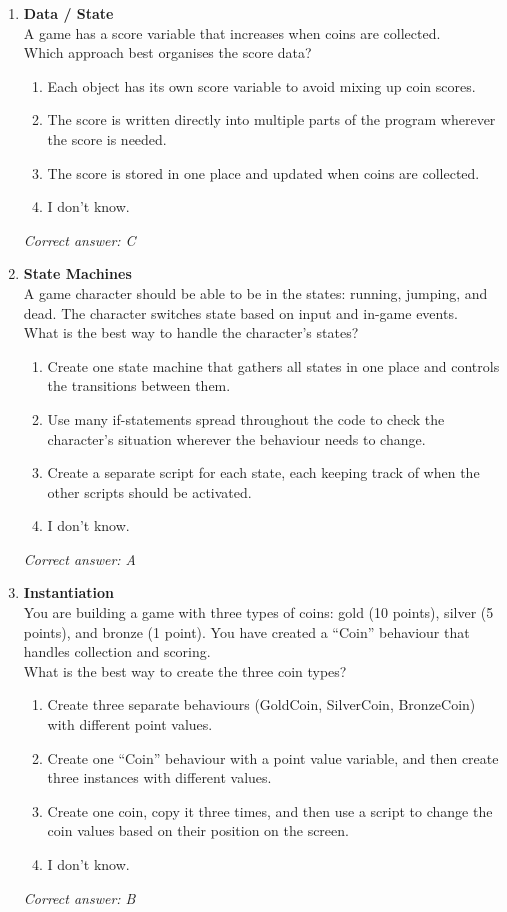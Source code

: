 \begin{enumerate}
	\item \textbf{Data / State} \\
	      A game has a score variable that increases when coins are collected. \\[0.5em]
	      Which approach best organises the score data?
	      \begin{enumerate}
		      \item Each object has its own score variable to avoid mixing up coin scores.
		      \item The score is written directly into multiple parts of the program wherever the score is needed.
		      \item The score is stored in one place and updated when coins are collected.
		      \item I don't know.
	      \end{enumerate}
	      \textit{Correct answer: C}

	\item \textbf{State Machines} \\
	      A game character should be able to be in the states: running, jumping, and dead. The character switches state based on input and in-game events. \\[0.5em]
	      What is the best way to handle the character's states?
	      \begin{enumerate}
		      \item Create one state machine that gathers all states in one place and controls the transitions between them.
		      \item Use many if-statements spread throughout the code to check the character's situation wherever the behaviour needs to change.
		      \item Create a separate script for each state, each keeping track of when the other scripts should be activated.
		      \item I don't know.
	      \end{enumerate}
	      \textit{Correct answer: A}

	\item \textbf{Instantiation} \\
	      You are building a game with three types of coins: gold (10 points), silver (5 points), and bronze (1 point). You have created a ``Coin'' behaviour that handles collection and scoring. \\[0.5em]
	      What is the best way to create the three coin types?
	      \begin{enumerate}
		      \item Create three separate behaviours (GoldCoin, SilverCoin, BronzeCoin) with different point values.
		      \item Create one ``Coin'' behaviour with a point value variable, and then create three instances with different values.
		      \item Create one coin, copy it three times, and then use a script to change the coin values based on their position on the screen.
		      \item I don't know.
	      \end{enumerate}
	      \textit{Correct answer: B}


\end{enumerate}
